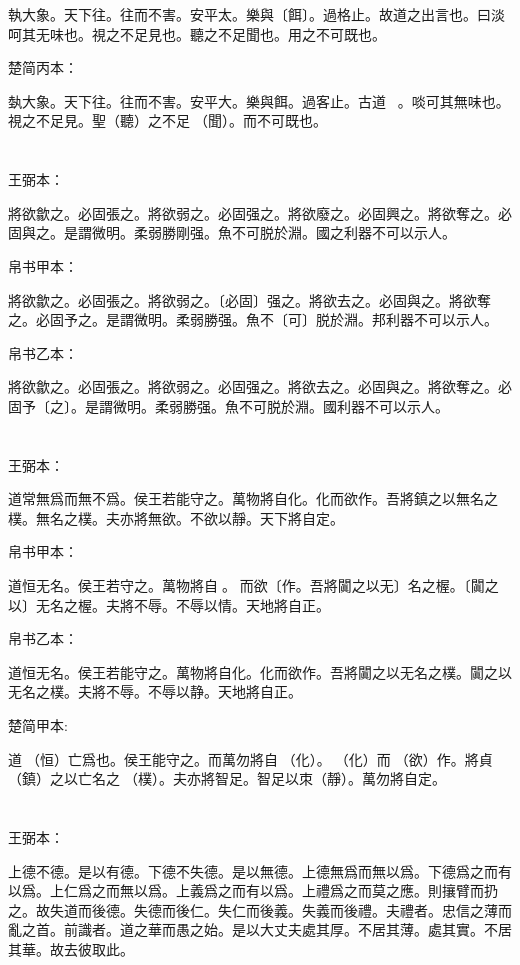 \documentclass[a5paper]{ctexbook}
\begin{document}
    執大象。天下往。往而不害。安平太。樂與〔餌〕。過格止。故道之出言也。曰淡呵其无味也。視之不足見也。聽之不足聞也。用之不可既也。

    楚简丙本：

    埶大象。天下往。往而不害。安平大。樂與餌。過客止。古道☐☐☐。啖可其無味也。視之不足見。聖（聽）之不足𦖞（聞）。而不可既也。

    \chapter{}
    王弼本：

    將欲歙之。必固張之。將欲弱之。必固强之。將欲廢之。必固興之。將欲奪之。必固與之。是謂微明。柔弱勝剛强。魚不可脱於淵。國之利器不可以示人。

    
    帛书甲本：

    將欲歙之。必固張之。將欲弱之。〔必固〕强之。將欲去之。必固與之。將欲奪之。必固予之。是謂微明。柔弱勝强。魚不〔可〕脱於淵。邦利器不可以示人。

    帛书乙本：

    將欲歙之。必固張之。將欲弱之。必固强之。將欲去之。必固與之。將欲奪之。必固予〔之〕。是謂微明。柔弱勝强。魚不可脱於淵。國利器不可以示人。

    \chapter{}
    王弼本：

    道常無爲而無不爲。侯王若能守之。萬物將自化。化而欲作。吾將鎮之以無名之樸。無名之樸。夫亦將無欲。不欲以靜。天下將自定。

    
    帛书甲本：

    道恒无名。侯王若守之。萬物將自𢡺。𢡺而欲〔作。吾將闐之以无〕名之楃。〔闐之以〕无名之楃。夫將不辱。不辱以情。天地將自正。

    帛书乙本：

    道恒无名。侯王若能守之。萬物將自化。化而欲作。吾將闐之以无名之樸。闐之以无名之樸。夫將不辱。不辱以静。天地將自正。

    楚简甲本:

    道𠄨（恒）亡爲也。侯王能守之。而萬勿將自𢠿（化）。𢠿（化）而𨿜（欲）作。將貞（鎮）之以亡名之󶴯（樸）。夫亦將智足。智足以朿（靜）。萬勿將自定。

    \chapter{}
    王弼本：

    上德不德。是以有德。下德不失德。是以無德。上德無爲而無以爲。下德爲之而有以爲。上仁爲之而無以爲。上義爲之而有以爲。上禮爲之而莫之應。則攘臂而扔之。故失道而後德。失德而後仁。失仁而後義。失義而後禮。夫禮者。忠信之薄而亂之首。前識者。道之華而愚之始。是以大丈夫處其厚。不居其薄。處其實。不居其華。故去彼取此。
\end{document}
